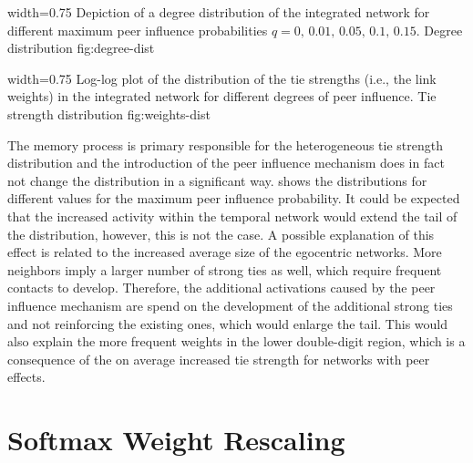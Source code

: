       {width=0.75\textwidth}
      {Depiction of a degree distribution of the integrated network for different maximum peer influence probabilities \( q = 0, \, 0.01, \, 0.05, \, 0.1, \, 0.15\).}
      {Degree distribution}
      {fig:degree-dist}


      {width=0.75\textwidth}
      {Log-log plot of the distribution of the tie strengths (i.e., the link weights) in the integrated network for different degrees of peer influence.}
      {Tie strength distribution}
      {fig:weights-dist}

The memory process is primary responsible for the heterogeneous tie strength distribution and the introduction of the peer influence mechanism does in fact not change the distribution in a significant way.
 shows the distributions for different values for the maximum peer influence probability.
It could be expected that the increased activity within the temporal network would extend the tail of the distribution, however, this is not the case.
A possible explanation of this effect is related to the increased average size of the egocentric networks.
More neighbors imply a larger number of strong ties as well, which require frequent contacts to develop.
Therefore, the additional activations caused by the peer influence mechanism are spend on the development of the additional strong ties and not reinforcing the existing ones, which would enlarge the tail.
This would also explain the more frequent weights in the lower double-digit region, which is a consequence of the on average increased tie strength for networks with peer effects.




\section{Softmax Weight Rescaling}
\label{sec:softmax-rescaling}
